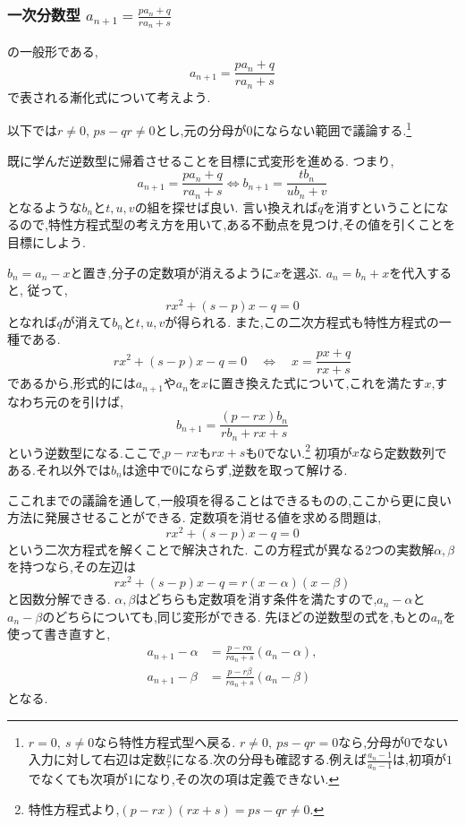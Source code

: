 
\subsubsection{\texorpdfstring{一次分数型   $a_{n+1}=\frac{pa_n+q}{ra_n+s}$}{一次分数型}}\label{節：一次分数型}
の一般形である,
\[
  a_{n+1}=\frac{pa_n+q}{ra_n+s}
\]
で表される漸化式について考えよう.

以下では$r\ne0$, $ps-qr\ne0$とし,元の分母が$0$にならない範囲で議論する.\footnote{$r=0,\ s\ne0$なら特性方程式型へ戻る.
  $r\ne0,\ ps-qr=0$なら,分母が0でない入力に対して右辺は定数$\frac{p}{r}$になる.次の分母も確認する.例えば$\frac{a_n-1}{a_n-1}$は,初項が$1$でなくても次項が$1$になり,その次の項は定義できない.}
  
既に学んだ逆数型に帰着させることを目標に式変形を進める.
つまり,
\[
  a_{n+1}=\frac{pa_n+q}{ra_n+s} \iff b_{n+1}=\frac{tb_n}{ub_n+v}
\]
となるような$b_n$と$t,u,v$の組を探せば良い.
言い換えれば$q$を消すということになるので,特性方程式型の考え方を用いて,ある不動点を見つけ,その値を引くことを目標にしよう.

$b_n=a_n-x$と置き,分子の定数項が消えるように$x$を選ぶ.
$a_n=b_n+x$を代入すると,
従って,
\[
  rx^2+(s-p)x-q=0
\]
となれば$q$が消えて$b_n$と$t,u,v$が得られる.
また,この二次方程式も特性方程式の一種である.
\[
  rx^2+(s-p)x-q=0
  \quad\Longleftrightarrow\quad
  x=\frac{px+q}{rx+s}
\]
であるから,形式的には$a_{n+1}$や$a_n$を$x$に置き換えた式について,これを満たす$x$,すなわち元のを引けば,
\[
  b_{n+1}=\frac{(p-rx)b_n}{rb_n+rx+s}
\]
という逆数型になる.ここで,$p-rx$も$rx+s$も0でない.\footnote{特性方程式より,$(p-rx)(rx+s)=ps-qr\ne0$.}
初項が$x$なら定数数列である.それ以外では$b_n$は途中で0にならず,逆数を取って解ける.

ここれまでの議論を通して,一般項を得ることはできるものの,ここから更に良い方法に発展させることができる.
定数項を消せる値を求める問題は,
\[
  rx^2+(s-p)x-q=0
\]
という二次方程式を解くことで解決された.
この方程式が異なる2つの実数解$\alpha,\beta$を持つなら,その左辺は
\[
  rx^2+(s-p)x-q=r(x-\alpha)(x-\beta)
\]
と因数分解できる.
$\alpha,\beta$はどちらも定数項を消す条件を満たすので,$a_n-\alpha$と$a_n-\beta$のどちらについても,同じ変形ができる.
先ほどの逆数型の式を,もとの$a_n$を使って書き直すと,
\begin{align*}
  a_{n+1}-\alpha
  &=\frac{p-r\alpha}{ra_n+s}(a_n-\alpha),\\
  a_{n+1}-\beta
  &=\frac{p-r\beta}{ra_n+s}(a_n-\beta)
\end{align*}
となる.

